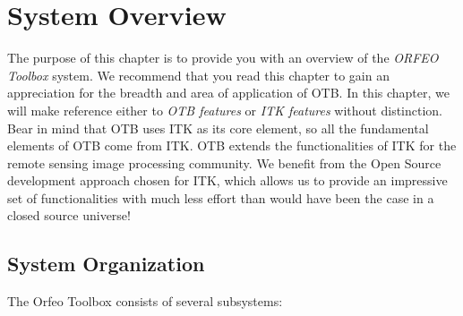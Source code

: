 \chapter{System Overview}
\label{chapter:SystemOverview}

The purpose of this chapter is to provide you with an overview of the
\emph{ORFEO Toolbox} system. We recommend that you read this chapter to
gain an appreciation for the breadth and area of application of
OTB. In this chapter, we will make reference either to \emph{OTB
  features} or \emph{ITK features} without distinction. Bear in mind
that OTB uses ITK as its core element, so all the fundamental elements
of OTB come from ITK. OTB extends the functionalities of ITK for the
remote sensing image processing community. We benefit from the Open
Source development approach chosen for ITK, which allows us to provide
an impressive set of functionalities with much less effort than
would have been the case in a closed source universe!

\section{System Organization}
\label{sec:SystemOrganization}

The Orfeo Toolbox consists of several subsystems:

